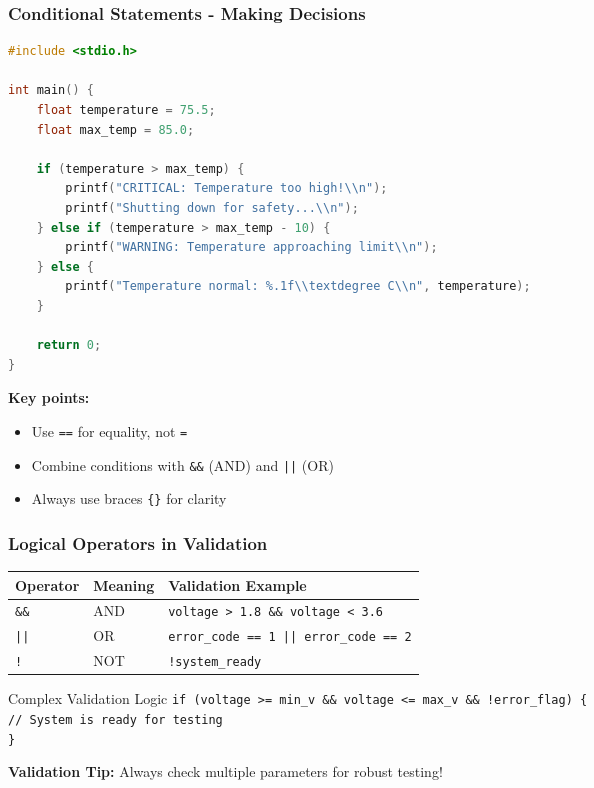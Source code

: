 \documentclass{beamer}
\begin{document}
\begin{frame}[fragile]
\frametitle{Conditional Statements - Making Decisions}
\begin{lstlisting}[language=C]
#include <stdio.h>

int main() {
    float temperature = 75.5;
    float max_temp = 85.0;

    if (temperature > max_temp) {
        printf("CRITICAL: Temperature too high!\\n");
        printf("Shutting down for safety...\\n");
    } else if (temperature > max_temp - 10) {
        printf("WARNING: Temperature approaching limit\\n");
    } else {
        printf("Temperature normal: %.1f\\textdegree C\\n", temperature);
    }

    return 0;
}
\end{lstlisting}

\textbf{Key points:}
\begin{itemize}
    \item Use \texttt{==} for equality, not \texttt{=}
    \item Combine conditions with \texttt{\&\&} (AND) and \texttt{||} (OR)
    \item Always use braces \texttt{\{\}} for clarity
\end{itemize}
\end{frame}

\begin{frame}
\frametitle{Logical Operators in Validation}
\begin{center}
\begin{tabular}{|l|l|l|}
\hline
\textbf{Operator} & \textbf{Meaning} & \textbf{Validation Example} \\
\hline
\texttt{\&\&} & AND & \texttt{voltage > 1.8 \&\& voltage < 3.6} \\
\texttt{||} & OR & \texttt{error\_code == 1 || error\_code == 2} \\
\texttt{!} & NOT & \texttt{!system\_ready} \\
\hline
\end{tabular}
\end{center}

\vspace{0.1cm}
\begin{exampleblock}{Complex Validation Logic}
\texttt{if (voltage >= min\_v \&\& voltage <= max\_v \&\& !error\_flag) \{\\
\quad // System is ready for testing\\
\}}
\end{exampleblock}

\vspace{0.1cm}
\textbf{Validation Tip:} Always check multiple parameters for robust testing!
\end{frame}
\end{document}
